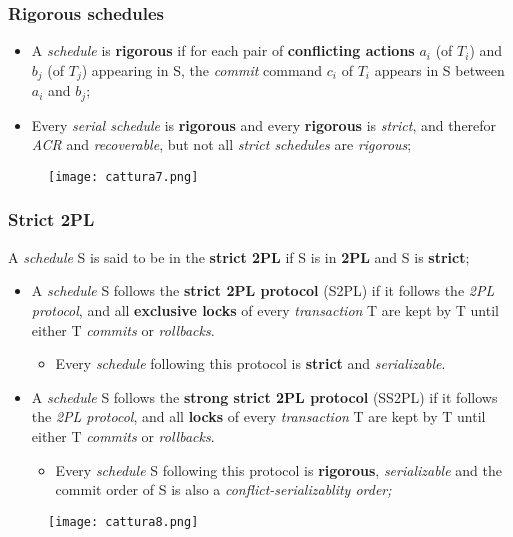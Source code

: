 \documentclass{article}
\begin{document}
\subsubsection{Rigorous schedules}
\begin{itemize}
\item A \emph{schedule} is \textbf{rigorous} if for each pair of \textbf{conflicting actions} $a_i$ (of $T_i$) and $b_j$ (of $T_j$) appearing in S, the \emph{commit} command $c_i$ of $T_i$ appears in S between $a_i$ and $b_j$;
\item Every \emph{serial schedule} is \textbf{rigorous} and every \textbf{rigorous} is \emph{strict}, and therefor \emph{ACR} and \emph{recoverable}, but not all \emph{strict schedules} are \emph{rigorous};
\end{itemize}
\begin{figure}[H]
  \centering
  \texttt{[image: cattura7.png]}
\end{figure}
\subsubsection{Strict 2PL}
A \emph{schedule} S is said to be in the \textbf{strict 2PL} if  S is in \textbf{2PL} and S is \textbf{strict};
\begin{itemize}
\item  A \emph{schedule} S follows the \textbf{strict 2PL protocol} (S2PL) if it follows the \emph{2PL protocol}, and all \textbf{exclusive locks} of every \emph{transaction} T are kept by T until either T \emph{commits} or \emph{rollbacks}. 
\begin{itemize}
\item Every \emph{schedule} following this protocol is \textbf{strict} and \emph{serializable}. 
\end{itemize}
\item A \emph{schedule} S follows the \textbf{strong strict 2PL protocol} (SS2PL) if it follows the \emph{2PL protocol}, and all \textbf{locks} of every \emph{transaction} T are kept by T until either T \emph{commits} or \emph{rollbacks}. 
\begin{itemize}
\item Every \emph{schedule} S following this protocol is \textbf{rigorous}, \emph{serializable} and the commit order of S is also a \emph{conflict-serializablity order;}
\end{itemize}
\end{itemize}
\begin{figure}[H]
  \centering
  \texttt{[image: cattura8.png]}
\end{figure}
\end{document}

